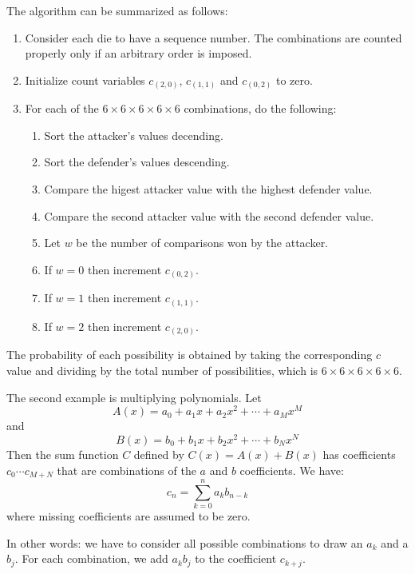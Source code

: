 \documentclass{article}
\begin{document}
The algorithm can be summarized as follows:
\begin{enumerate}
\item Consider each die to have a sequence number. The combinations are counted properly only if an arbitrary order is imposed.
\item Initialize count variables $c_{(2, 0)}$, $c_{(1,1)}$ and $c_{(0, 2)}$ to zero.
\item For each of the $6 \times 6 \times 6 \times 6 \times 6$ combinations, do the following:
\begin{enumerate}
\item Sort the attacker's values decending.
\item Sort the defender's values descending.
\item Compare the higest attacker value with the highest defender value.
\item Compare the second attacker value with the second defender value.
\item Let $w$ be the number of comparisons won by the attacker.
\item If $w = 0$ then increment $c_{(0, 2)}$.
\item If $w = 1$ then increment $c_{(1, 1)}$.
\item If $w = 2$ then increment $c_{(2, 0)}$.
\end{enumerate}
\end{enumerate}
The probability of each possibility is obtained by taking the corresponding $c$ value and dividing by the total number of possibilities, which is $6 \times 6 \times 6 \times 6 \times 6$.

The second example is multiplying polynomials. Let
\begin{equation}
A(x) = a_0 + a_1 x + a_2 x^2 + \cdots + a_M x^M
\end{equation}
and
\begin{equation}
B(x) = b_0 + b_1 x + b_2 x^2 + \cdots + b_N x^N
\end{equation}
Then the sum function $C$ defined by $C(x) = A(x) + B(x)$ has coefficients $c_0 \cdots c_{M+N}$ that are combinations of the $a$ and $b$ coefficients. We have:
\begin{equation}
c_n = \sum_{k=0}^{n} a_{k} b_{n-k}
\end{equation}
where missing coefficients are assumed to be zero.

In other words: we have to consider all possible combinations to draw an $a_k$ and a $b_j$. For each combination, we add $a_k b_j$ to the coefficient $c_{k+j}$.
\end{document}
